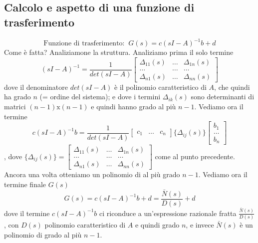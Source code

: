 \subsection{Calcolo e aspetto di una funzione di trasferimento}
\[
    \text{Funzione di trasferimento:}\;\; G(s) = c(sI-A)^{-1} b +d
\]
Come è fatta? Analiziamone la struttura.\newline
\newline
Analiziamo prima il solo termine
\[
    (sI-A)^{-1} = \frac{1}{det(sI-A)} \left[\begin{matrix}
        \Delta_{11}(s) & \dots & \Delta_{1n}(s)\\
        \dots & \dots & \dots \\
        \Delta_{n1}(s) & \dots & \Delta_{nn}(s)
    \end{matrix}\right]
\] 
dove il denominatore $det(sI-A)$ è il polinomio caratteristico di $A$, che quindi ha grado $n$ (= ordine del sistema); e dove i termini $\Delta_{ik}(s)$ sono determinanti di matrici $(n-1)\text{x}(n-1)$ e quindi hanno grado al più $n-1$.\newline
\newline
Vediamo ora il termine
\[
    c(sI-A)^{-1} b = \frac{1}{det(sI-A)} \left[\begin{matrix}
        c_1 & \dots & c_n
        \end{matrix}\right] \{\Delta_{ij}(s)\}\left[\begin{matrix}
            b_1\\
            \dots\\
            b_n
    \end{matrix}\right]
\], dove $\{\Delta_{ij}(s)\} = \left[\begin{matrix}
    \Delta_{11}(s) & \dots & \Delta_{1n}(s)\\
    \dots & \dots & \dots \\
    \Delta_{n1}(s) & \dots & \Delta_{nn}(s)
\end{matrix}\right]$ come al punto precedente. Ancora una volta otteniamo un polinomio di al più grado $n-1$.\newline
\newline
Vediamo ora il termine finale $G(s)$
\[
    G(s) = c(sI-A)^{-1} b +d = \frac{\bar{N}(s)}{D(s)} +d
\]
dove il termine $c(sI-A)^{-1} b$ ci riconduce a un'espressione razionale fratta $\frac{\bar{N}(s)}{D(s)}$, con $D(s)$ polinomio caratteristico di $A$ e quindi grado $n$, e invece $\bar{N}(s)$ è un polinomio di grado al più $n-1$.\newline
